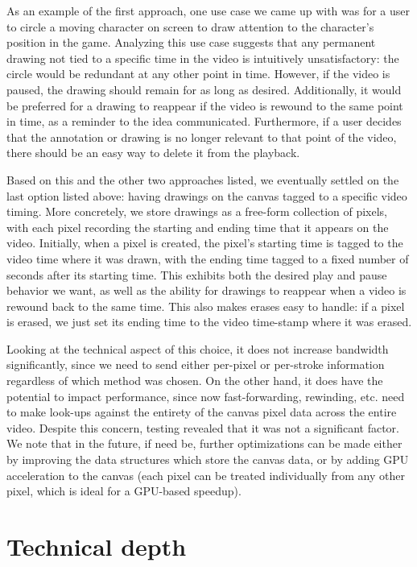 \documentclass[conference]{IEEEtran}
\begin{document}
  As an example of the first approach, one use case we came up with was for a user to circle a moving character on screen to draw attention to the character's position in the game. Analyzing this use case suggests that any permanent drawing not tied to a specific time in the video is intuitively unsatisfactory: the circle would be redundant at any other point in time. However, if the video is paused, the drawing should remain for as long as desired. Additionally, it would be preferred for a drawing to reappear if the video is rewound to the same point in time, as a reminder to the idea communicated. Furthermore, if a user decides that the annotation or drawing is no longer relevant to that point of the video, there should be an easy way to delete it from the playback.

  Based on this and the other two approaches listed, we eventually settled on the last option listed above: having drawings on the canvas tagged to a specific video timing. More concretely, we store drawings as a free-form collection of pixels, with each pixel recording the starting and ending time that it appears on the video. Initially, when a pixel is created, the pixel's starting time is tagged to the video time where it was drawn, with the ending time tagged to a fixed number of seconds after its starting time. This exhibits both the desired play and pause behavior we want, as well as the ability for drawings to reappear when a video is rewound back to the same time. This also makes erases easy to handle: if a pixel is erased, we just set its ending time to the video time-stamp where it was erased.

  Looking at the technical aspect of this choice, it does not increase bandwidth significantly, since we need to send either per-pixel or per-stroke information regardless of which method was chosen. On the other hand, it does have the potential to impact performance, since now fast-forwarding, rewinding, etc. need to make look-ups against the entirety of the canvas pixel data across the entire video. Despite this concern, testing revealed that it was not a significant factor. We note that in the future, if need be, further optimizations can be made either by improving the data structures which store the canvas data, or by adding GPU acceleration to the canvas (each pixel can be treated individually from any other pixel, which is ideal for a GPU-based speedup).

\section{Technical depth}
\end{document}
